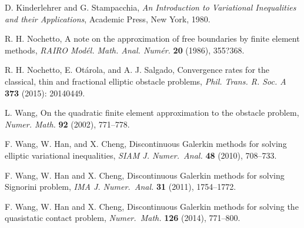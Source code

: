 \documentclass[12pt]{article}
\begin{document}
\begin{thebibliography}{10}


D. Kinderlehrer and G. Stampacchia, \emph{An Introduction to Variational
Inequalities and their Applications}, Academic Press, New York, 1980.

%

R. H. Nochetto,  A note on the approximation of free boundaries by finite element methods,
\emph{RAIRO Mod\'el. Math. Anal. Num\'er.} {\bf 20} (1986), 355?368.

R. H. Nochetto, E. Ot\'arola, and A. J. Salgado, Convergence rates for the classical, thin and fractional elliptic obstacle problems, \emph{Phil. Trans. R. Soc. A} {\bf 373} (2015): 20140449.



 L. Wang, On the quadratic finite element approximation
to the obstacle problem, \emph{Numer. Math.} {\bf 92} (2002),
771--778.

F. Wang, W. Han, and X. Cheng, Discontinuous Galerkin methods for solving elliptic 
variational inequalities, \emph{SIAM J. Numer.\ Anal.} {\bf 48} (2010), 708--733.

F. Wang, W. Han and X. Cheng, Discontinuous Galerkin methods for solving Signorini problem, 
\emph{IMA J. Numer.\ Anal.} {\bf 31} (2011), 1754--1772.

F. Wang, W. Han and X. Cheng, Discontinuous Galerkin methods for solving the quasistatic 
contact problem, \emph{Numer.\ Math.} {\bf 126} (2014), 771--800. 




\end{thebibliography}
\end{document}
